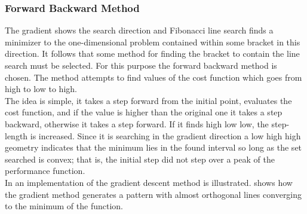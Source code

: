 \subsubsection{Forward Backward Method}
The gradient shows the search direction and Fibonacci line search finds a minimizer to the one-dimensional problem contained within some bracket in this direction. It follows that some method for finding the bracket to contain the line search must be selected. For this purpose the forward backward method is chosen. The method attempts to find values of the cost function which goes from high to low to high.\\
The idea is simple, it takes a step forward from the initial point, evaluates the cost function, and if the value is higher than the original one it takes a step backward, otherwise it takes a step forward. If it finds high low low, the step-length is increased. Since it is searching in the gradient direction a low high high geometry indicates that the minimum lies in the found interval so long as the set searched is convex; that is, the initial step did not step over a peak of the performance function.\\
In  an implementation of the gradient descent method is illustrated.  shows how the gradient method generates a pattern with almost orthogonal lines converging to the minimum of the function.

